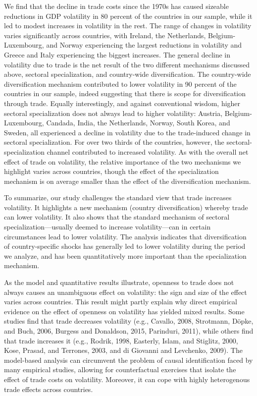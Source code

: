 \documentclass[12pt]{article}
\begin{document}
We find that the decline in trade costs since the 1970s has caused sizeable
reductions in GDP volatility in 80 percent of the countries in our sample,
while it led to modest increases in volatility in the rest. The range of
changes in volatility varies significantly across countries, with Ireland,
the Netherlands, Belgium-Luxembourg, and Norway experiencing the largest
reductions in volatility and Greece and Italy experiencing the biggest
increases. The general decline in volatility due to trade is the net result
of the two different mechanisms discussed above, sectoral specialization,
and country-wide diversification. The country-wide diversification mechanism
contributed to lower volatility in 90 percent of the countries in our
sample, indeed suggesting that there is scope for diversification through
trade. Equally interestingly, and against conventional wisdom, higher
sectoral specialization does not always lead to higher volatility: Austria,
Belgium-Luxembourg, Candada, India, the Netherlands, Norway, South Korea,
and Sweden, all experienced a decline in volatility due to the trade-induced
change in sectoral specialization. For over two thirds of the countries,
however, the sectoral-specialization channel contributed to increased
volatility. As with the overall net effect of trade on volatility, the
relative importance of the two mechanisms we highlight varies across
countries, though the effect of the specialization mechanism is on average
smaller than the effect of the diversification mechanism.

To summarize, our study challenges the standard view that trade increases
volatility. It highlights a new mechanism (country diversification) whereby
trade can lower volatility. It also shows that the standard mechanism of
sectoral specialization---usually deemed to increase volatility---can in
certain circumstances lead to lower volatility. The analysis indicates that
diversification of country-specific shocks has generally led to lower
volatility during the period we analyze, and has been quantitatively more
important than the specialization mechanism.

As the model and quantitative results illustrate, openness to trade does not
always causes an unambiguous effect on volatility: the sign and size of the
effect varies across countries. This result might partly explain why direct
empirical evidence on the effect of openness on volatility has yielded mixed
results. Some studies find that trade decreases volatility (e.g., Cavallo,
2008, Strotmann, D\"{o}pke, and Buch, 2006, Burgess and Donaldson, 2015,
Parinduri, 2011), while others find that trade increases it (e.g., Rodrik,
1998, Easterly, Islam, and Stiglitz, 2000, Kose, Prasad, and Terrones, 2003,
and di Giovanni and Levchenko, 2009). The model-based analysis can
circumvent the problem of causal identification faced by many empirical
studies, allowing for counterfactual exercises that isolate the effect of
trade costs on volatility. Moreover, it can cope with highly heterogenous
trade effects across countries.
\end{document}
